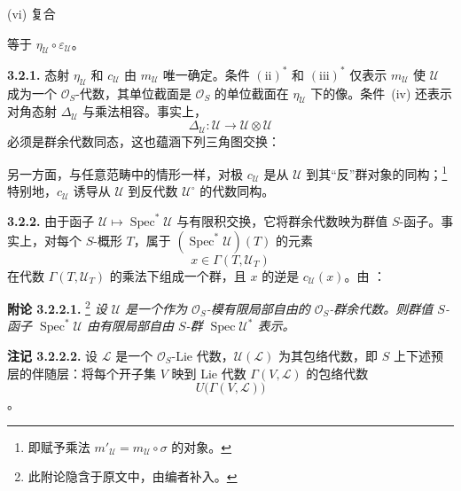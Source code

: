 \smallskip
\noindent
(vi) 复合
\begin{center}
  \label{sga3:VIIA:3.2-antipode-sequence-vi}
  
\end{center}
等于 \(\eta_{\mathcal U}\circ\varepsilon_{\mathcal U}\)。

\medskip
\noindent\textbf{3.2.1.}
\label{sga3:VIIA:3.2.1}
态射 \(\eta_{\mathcal U}\) 和 \(c_{\mathcal U}\) 由 \(m_{\mathcal U}\) 唯一确定。条件 \((\mathrm{ii})^{*}\) 和 \((\mathrm{iii})^{*}\) 仅表示 \(m_{\mathcal U}\) 使 \(\mathcal U\) 成为一个 \(\mathcal O_S\)-代数，其单位截面是 \(\mathcal O_S\) 的单位截面在 \(\eta_{\mathcal U}\) 下的像。条件~(iv) 还表示对角态射 \(\Delta_{\mathcal U}\) 与乘法相容。事实上，
\[
  \Delta_{\mathcal U}:\mathcal U\longrightarrow
  \mathcal U\otimes\mathcal U
\]
必须是群余代数同态，这也蕴涵下列三角图交换：
\begin{center}
  \label{sga3:VIIA:3.2.1-unit-triangle-v-star}
  
\end{center}

另一方面，与任意范畴中的情形一样，对极 \(c_{\mathcal U}\) 是从 \(\mathcal U\) 到其“反”群对象的同构；\footnote{即赋予乘法 \(m'_{\mathcal U}=m_{\mathcal U}\circ\sigma\) 的对象。}
特别地，\(c_{\mathcal U}\) 诱导从 \(\mathcal U\) 到反代数 \(\mathcal U^{\circ}\) 的代数同构。

\medskip
\noindent\textbf{3.2.2.}
\label{sga3:VIIA:3.2.2}
由于函子 \(\mathcal U\mapsto\operatorname{Spec}^{*}\mathcal U\) 与有限积交换，它将群余代数映为群值 \(S\)-函子。事实上，对每个 \(S\)-概形 \(T\)，属于 \((\operatorname{Spec}^{*}\mathcal U)(T)\) 的元素
\[
  x\in\Gamma(T,\mathcal U_T)
\]
在代数 \(\Gamma(T,\mathcal U_T)\) 的乘法下组成一个群，且 \(x\) 的逆是 \(c_{\mathcal U}(x)\)。由 ：

\medskip
\noindent\textbf{附论 3.2.2.1.}
\label{sga3:VIIA:3.2.2.1}
\footnote{此附论隐含于原文中，由编者补入。}
\textit{设 \(\mathcal U\) 是一个作为 \(\mathcal O_S\)-模有限局部自由的 \(\mathcal O_S\)-群余代数。则群值 \(S\)-函子 \(\operatorname{Spec}^{*}\mathcal U\) 由有限局部自由 \(S\)-群 \(\operatorname{Spec}\mathcal U^{*}\) 表示。}

\medskip
\noindent\textbf{注记 3.2.2.2.}
\label{sga3:VIIA:3.2.2.2}
设 \(\mathcal L\) 是一个 \(\mathcal O_S\)-Lie 代数，\(\mathcal U(\mathcal L)\) 为其包络代数，即 \(S\) 上下述预层的伴随层：将每个开子集 \(V\) 映到 Lie 代数 \(\Gamma(V,\mathcal L)\) 的包络代数
\[
  U\bigl(\Gamma(V,\mathcal L)\bigr)
\]
。

